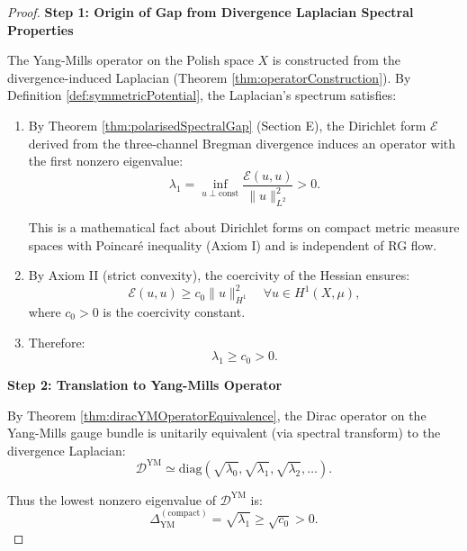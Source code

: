 \begin{lemma}
\begin{lemma}
\begin{proof}
\textbf{Step 1: Origin of Gap from Divergence Laplacian Spectral Properties}

The Yang-Mills operator on the Polish space $X$ is constructed from the divergence-induced Laplacian (Theorem \ref{thm:operatorConstruction}). By Definition \ref{def:symmetricPotential}, the Laplacian's spectrum satisfies:

\begin{enumerate}
\item By Theorem \ref{thm:polarisedSpectralGap} (Section E), the Dirichlet form $\mathcal{E}$ derived from the three-channel Bregman divergence induces an operator with the first nonzero eigenvalue:
\begin{equation}
\lambda_1 = \inf_{u \perp \text{const}} \frac{\mathcal{E}(u,u)}{\|u\|_{L^2}^2} > 0.
\end{equation}

This is a mathematical fact about Dirichlet forms on compact metric measure spaces with Poincaré inequality (Axiom I) and is independent of RG flow.

\item By Axiom II (strict convexity), the coercivity of the Hessian ensures:
\begin{equation}
\mathcal{E}(u,u) \geq c_0 \|u\|_{H^1}^2 \quad \forall u \in H^1(X, \mu),
\end{equation}
where $c_0 > 0$ is the coercivity constant.

\item Therefore:
\begin{equation}
\lambda_1 \geq c_0 > 0.
\end{equation}
\end{enumerate}

\textbf{Step 2: Translation to Yang-Mills Operator}

By Theorem \ref{thm:diracYMOperatorEquivalence}, the Dirac operator on the Yang-Mills gauge bundle is unitarily equivalent (via spectral transform) to the divergence Laplacian:
\begin{equation}
\mathcal{D}^{\mathrm{YM}} \simeq \text{diag}(\sqrt{\lambda_0}, \sqrt{\lambda_1}, \sqrt{\lambda_2}, \ldots).
\end{equation}

Thus the lowest nonzero eigenvalue of $\mathcal{D}^{\mathrm{YM}}$ is:
\begin{equation}
\Delta_{\mathrm{YM}}^{(\text{compact})} = \sqrt{\lambda_1} \geq \sqrt{c_0} > 0.
\end{equation}


\end{proof}
\end{lemma}
\end{lemma}
